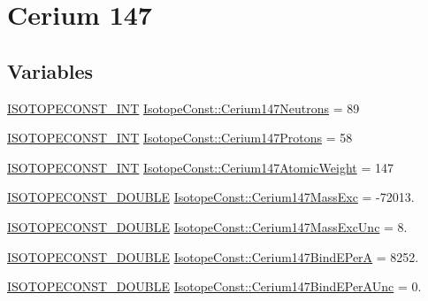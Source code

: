 \hypertarget{group___isotope_const-_cerium-_ce147}{}\section{Cerium 147}
\label{group___isotope_const-_cerium-_ce147}
\subsection*{Variables}
\begin{DoxyCompactItemize}
\item 
\mbox{\hyperlink{group___isotope_const-_macros_ga5f18360b3e99483a35c32d789e62621c}{I\+S\+O\+T\+O\+P\+E\+C\+O\+N\+S\+T\+\_\+\+I\+NT}} \mbox{\hyperlink{group___isotope_const-_cerium-_ce147_gad275fade596e67e056919823c2565cc8}{Isotope\+Const\+::\+Cerium147\+Neutrons}} = 89
\item 
\mbox{\hyperlink{group___isotope_const-_macros_ga5f18360b3e99483a35c32d789e62621c}{I\+S\+O\+T\+O\+P\+E\+C\+O\+N\+S\+T\+\_\+\+I\+NT}} \mbox{\hyperlink{group___isotope_const-_cerium-_ce147_ga47f09f97e21ab0622132f0ddb76ca349}{Isotope\+Const\+::\+Cerium147\+Protons}} = 58
\item 
\mbox{\hyperlink{group___isotope_const-_macros_ga5f18360b3e99483a35c32d789e62621c}{I\+S\+O\+T\+O\+P\+E\+C\+O\+N\+S\+T\+\_\+\+I\+NT}} \mbox{\hyperlink{group___isotope_const-_cerium-_ce147_ga58f5cdf0fd482279b9d9203b3961497d}{Isotope\+Const\+::\+Cerium147\+Atomic\+Weight}} = 147
\item 
\mbox{\hyperlink{group___isotope_const-_macros_ga8f45a7272ce02c0b4c65c44636ed719a}{I\+S\+O\+T\+O\+P\+E\+C\+O\+N\+S\+T\+\_\+\+D\+O\+U\+B\+LE}} \mbox{\hyperlink{group___isotope_const-_cerium-_ce147_gac3d96aa963618faed0d71dbeddda86fc}{Isotope\+Const\+::\+Cerium147\+Mass\+Exc}} = -\/72013.
\item 
\mbox{\hyperlink{group___isotope_const-_macros_ga8f45a7272ce02c0b4c65c44636ed719a}{I\+S\+O\+T\+O\+P\+E\+C\+O\+N\+S\+T\+\_\+\+D\+O\+U\+B\+LE}} \mbox{\hyperlink{group___isotope_const-_cerium-_ce147_gaff2fce2d3544c81c68dd8855d9b48654}{Isotope\+Const\+::\+Cerium147\+Mass\+Exc\+Unc}} = 8.
\item 
\mbox{\hyperlink{group___isotope_const-_macros_ga8f45a7272ce02c0b4c65c44636ed719a}{I\+S\+O\+T\+O\+P\+E\+C\+O\+N\+S\+T\+\_\+\+D\+O\+U\+B\+LE}} \mbox{\hyperlink{group___isotope_const-_cerium-_ce147_gaa676923faaaf745c5b19a1d7c884ae37}{Isotope\+Const\+::\+Cerium147\+Bind\+E\+PerA}} = 8252.
\item 
\mbox{\hyperlink{group___isotope_const-_macros_ga8f45a7272ce02c0b4c65c44636ed719a}{I\+S\+O\+T\+O\+P\+E\+C\+O\+N\+S\+T\+\_\+\+D\+O\+U\+B\+LE}} \mbox{\hyperlink{group___isotope_const-_cerium-_ce147_ga120346962357aa75340ddef4fc71e826}{Isotope\+Const\+::\+Cerium147\+Bind\+E\+Per\+A\+Unc}} = 0.

\end{DoxyCompactItemize}
